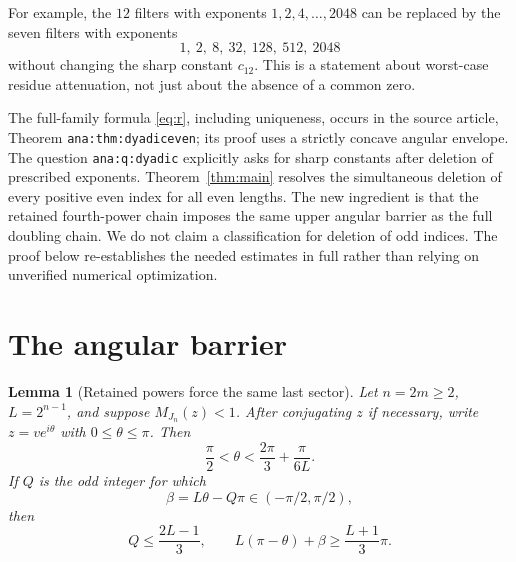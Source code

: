 \documentclass[11pt]{article}
\newtheorem{lemma}[theorem]{Lemma}
\begin{document}
For example, the $12$ filters with exponents $1,2,4,\ldots,2048$ can be replaced by the seven filters with exponents
\[
 1,\ 2,\ 8,\ 32,\ 128,\ 512,\ 2048
\]
without changing the sharp constant $c_{12}$. This is a statement about worst-case residue attenuation, not just about the absence of a common zero.

The full-family formula \eqref{eq:r}, including uniqueness, occurs in the source article, Theorem \texttt{ana:thm:dyadiceven}; its proof uses a strictly concave angular envelope. The question \texttt{ana:q:dyadic} explicitly asks for sharp constants after deletion of prescribed exponents. Theorem~\ref{thm:main} resolves the simultaneous deletion of every positive even index for all even lengths. The new ingredient is that the retained fourth-power chain imposes the same upper angular barrier as the full doubling chain. We do not claim a classification for deletion of odd indices. The proof below re-establishes the needed estimates in full rather than relying on unverified numerical optimization.

\section{The angular barrier}

\begin{lemma}[Retained powers force the same last sector]\label{lem:barrier}
Let $n=2m\ge2$, $L=2^{n-1}$, and suppose $M_{J_n}(z)<1$. After conjugating $z$ if necessary, write $z=v e^{i\theta}$ with $0\le\theta\le\pi$. Then
\begin{equation}\label{eq:barrier}
 \frac\pi2<\theta<\frac{2\pi}3+\frac{\pi}{6L}.
\end{equation}
If $Q$ is the odd integer for which
\[
 \beta=L\theta-Q\pi\in(-\pi/2,\pi/2),
\]
then
\begin{equation}\label{eq:Q}
 Q\le\frac{2L-1}{3},\qquad
 L(\pi-\theta)+\beta\ge\frac{L+1}{3}\pi.
\end{equation}
\end{lemma}
\end{document}

